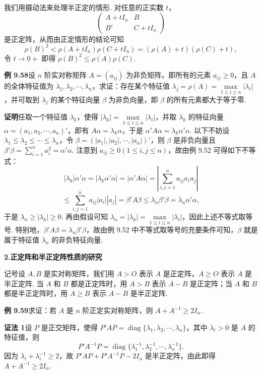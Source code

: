 \documentclass[UTF8,12pt,a4paper,fontset=fandol]{ctexart}
\begin{document}
我们用摄动法来处理半正定的情形. 对任意的正实数 $t$，
\[
\begin{pmatrix}
A+tI_n&B\\
B'&C+tI_n
\end{pmatrix}
\]
是正定阵，从而由正定情形的结论可知
\[
\rho(B)^2<\rho(A+tI_n)\rho(C+tI_n)=(\rho(A)+t)(\rho(C)+t),
\]
令 $t\to0+$ 即得 $\rho(B)^2\le\rho(A)\rho(C)$.

\noindent\textbf{例 9.58}\quad 设 $n$ 阶实对称矩阵 $A=(a_{ij})$ 为非负矩阵，即所有的元素 $a_{ij}\ge0$，且 $A$ 的全体特征值为 $\lambda_1,\lambda_2,\cdots,\lambda_n$，求证：存在某个特征值 $\lambda_j=\rho(A)=\max\limits_{1\le i\le n}|\lambda_i|$，并可取到 $\lambda_j$ 的某个特征向量 $\beta$ 为非负向量，即 $\beta$ 的所有元素都大于等于零.

\noindent\textbf{证明}\quad 任取一个特征值 $\lambda_k$，使得 $|\lambda_k|=\max\limits_{1\le i\le n}|\lambda_i|$，并取 $\lambda_k$ 的特征向量 $\alpha=(a_1,a_2,\cdots,a_n)'$，即有 $A\alpha=\lambda_k\alpha$，于是 $\alpha'A\alpha=\lambda_k\alpha'\alpha$. 以下不妨设 $\lambda_1\le\lambda_2\le\cdots\le\lambda_n$，令 $\beta=(|a_1|,|a_2|,\cdots,|a_n|)'$，则 $\beta$ 是非负向量且 $\beta'\beta=\sum_{i=1}^na_i^2=\alpha'\alpha$. 注意到 $a_{ij}\ge0(1\le i,j\le n)$，故由例 9.52 可得如下不等式：
\[
|\lambda_k|\alpha'\alpha=|\lambda_k\alpha'\alpha|=|\alpha'A\alpha|=
\left|\sum_{i,j=1}^na_{ij}a_ia_j\right|
\]
\[
\le\sum_{i,j=1}^na_{ij}|a_i||a_j|=\beta'A\beta\le\lambda_n\beta'\beta=\lambda_n\alpha'\alpha,
\]
于是 $\lambda_n\ge|\lambda_k|\ge0$. 再由假设可知 $\lambda_n=|\lambda_k|=\max\limits_{1\le i\le n}|\lambda_i|$，因此上述不等式取等号. 特别地，$\beta'A\beta=\lambda_n\beta'\beta$，故由例 9.52 中不等式取等号的充要条件可知，$\beta$ 就是属于特征值 $\lambda_n$ 的非负特征向量.

\noindent\textbf{2.\quad 正定阵和半正定阵性质的研究}

记号\quad 设 $A,B$ 是实对称矩阵，我们用 $A>O$ 表示 $A$ 是正定阵，$A\ge O$ 表示 $A$ 是半正定阵. 当 $A$ 和 $B$ 都是正定阵时，用 $A>B$ 表示 $A-B$ 是正定阵；当 $A$ 和 $B$ 都是半正定阵时，用 $A\ge B$ 表示 $A-B$ 是半正定阵.

\noindent\textbf{例 9.59}\quad 求证：若 $A$ 是 $n$ 阶正定实对称矩阵，则 $A+A^{-1}\ge2I_n$.

\noindent\textbf{证法 1}\quad 设 $P$ 是正交矩阵，使得 $P'AP=\operatorname{diag}\{\lambda_1,\lambda_2,\cdots,\lambda_n\}$，其中 $\lambda_i>0$ 是 $A$ 的特征值，则
\[
P'A^{-1}P=\operatorname{diag}\{\lambda_1^{-1},\lambda_2^{-1},\cdots,\lambda_n^{-1}\}.
\]
因为 $\lambda_i+\lambda_i^{-1}\ge2$，故 $P'AP+P'A^{-1}P-2I_n$ 是半正定阵，由此即得 $A+A^{-1}\ge2I_n$.
\end{document}
